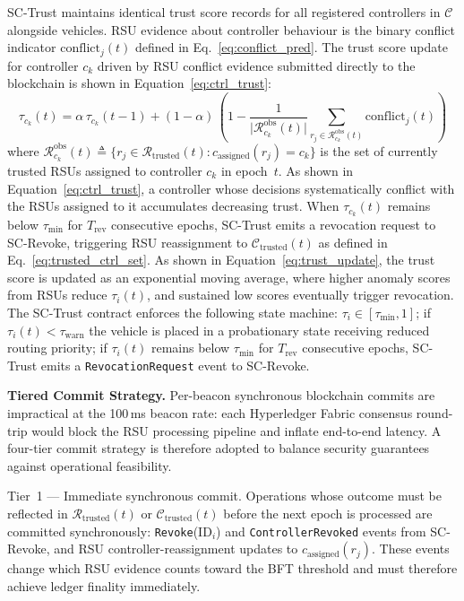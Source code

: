 \documentclass[12pt, a4paper]{report}
\begin{document}
SC-Trust maintains identical trust score records for all
registered controllers in $\mathcal{C}$ alongside vehicles.
RSU evidence about controller behaviour is the binary conflict
indicator $\mathrm{conflict}_j(t)$ defined in
Eq.~\eqref{eq:conflict_pred}. The trust score update for
controller $c_k$ driven by RSU conflict evidence submitted
directly to the blockchain is shown in
Equation~\eqref{eq:ctrl_trust}:
\begin{equation}
  \tau_{c_k}(t) = \alpha\,\tau_{c_k}(t-1) + (1-\alpha)\,
    \left(1 -
      \frac{1}{\bigl|\mathcal{R}^{\mathrm{obs}}_{c_k}(t)\bigr|}
      \sum_{r_j \in \mathcal{R}^{\mathrm{obs}}_{c_k}(t)}
      \mathrm{conflict}_j(t)\right)
  \label{eq:ctrl_trust}
\end{equation}
where
$\mathcal{R}^{\mathrm{obs}}_{c_k}(t)
  \triangleq \{r_j \in \mathcal{R}_{\mathrm{trusted}}(t)
  : c_{\mathrm{assigned}}(r_j) = c_k\}$
is the set of currently trusted RSUs assigned to controller
$c_k$ in epoch~$t$.
As shown in Equation~\eqref{eq:ctrl_trust}, a controller whose
decisions systematically conflict with the RSUs assigned to it
accumulates decreasing trust. When $\tau_{c_k}(t)$ remains below
$\tau_{\min}$ for $T_{\mathrm{rev}}$ consecutive epochs,
SC-Trust emits a revocation request to SC-Revoke, triggering
RSU reassignment to $\mathcal{C}_{\mathrm{trusted}}(t)$ as
defined in Eq.~\eqref{eq:trusted_ctrl_set}. As shown in
Equation~\ref{eq:trust_update}, the trust score is updated as an
exponential moving average, where higher anomaly scores from RSUs
reduce $\tau_i(t)$, and sustained low scores eventually trigger
revocation. The SC-Trust contract enforces the following state
machine: $\tau_i \in [\tau_{\min}, 1]$; if
$\tau_i(t) < \tau_{\mathrm{warn}}$ the vehicle is placed in a
probationary state receiving reduced routing priority;
if $\tau_i(t)$ remains below $\tau_{\min}$ for $T_{\mathrm{rev}}$
consecutive epochs, SC-Trust emits a \texttt{RevocationRequest}
event to SC-Revoke.

\textbf{Tiered Commit Strategy.}
Per-beacon synchronous blockchain commits are impractical at the
100\,ms beacon rate: each Hyperledger Fabric consensus round-trip
would block the RSU processing pipeline and inflate end-to-end
latency. A four-tier commit strategy is therefore adopted to balance
security guarantees against operational feasibility.

Tier~1 --- Immediate synchronous commit.
Operations whose outcome must be reflected in
$\mathcal{R}_{\mathrm{trusted}}(t)$ or
$\mathcal{C}_{\mathrm{trusted}}(t)$ before the next epoch is
processed are committed synchronously: \texttt{Revoke}($\mathrm{ID}_i$)
and \texttt{ControllerRevoked} events from SC-Revoke, and RSU
controller-reassignment updates to $c_{\mathrm{assigned}}(r_j)$.
These events change which RSU evidence counts toward the BFT
threshold and must therefore achieve ledger finality immediately.
\end{document}
